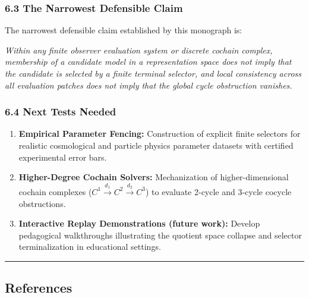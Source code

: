 \documentclass[
  10pt,
]{article}
\renewenvironment{quote}
  {\begin{leftbar}\small}
  {\end{leftbar}}
\begin{document}
\subsubsection{6.3 The Narrowest Defensible Claim}\label{the-narrowest-defensible-claim}

The narrowest defensible claim established by this monograph is:

\begin{quote}
\emph{Within any finite observer evaluation system or discrete cochain complex, membership of a candidate model in a representation space does not imply that the candidate is selected by a finite terminal selector, and local consistency across all evaluation patches does not imply that the global cycle obstruction vanishes.}
\end{quote}

\subsubsection{6.4 Next Tests Needed}\label{next-tests-needed}

\begin{enumerate}
\def\labelenumi{\arabic{enumi}.}
\item
  \textbf{Empirical Parameter Fencing:} Construction of explicit finite selectors for realistic cosmological and particle physics parameter datasets with certified experimental error bars.
\item
  \textbf{Higher-Degree Cochain Solvers:} Mechanization of higher-dimensional cochain complexes (\hypertarget{math-E0225-0343}{}{\(C^1 \xrightarrow{d_1} C^2 \xrightarrow{d_2} C^3\)}) to evaluate 2-cycle and 3-cycle cocycle obstructions.
\item
  \textbf{Interactive Replay Demonstrations (future work):} Develop pedagogical walkthroughs illustrating the quotient space collapse and selector terminalization in educational settings.
\end{enumerate}

\begin{center}\rule{0.5\linewidth}{0.5pt}\end{center}

\subsection{References}\label{references}
\end{document}
